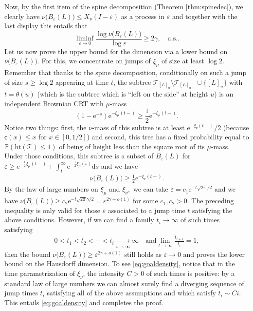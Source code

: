 \documentclass[11pt]{article}
\newcommand{\dH}{\gamma}
\newcommand{\cc}{\mathsf{c}}
\newcommand{\ff}{\cc}
\newcommand{\T}{\mathcal{T}}
\renewcommand{\geq}{\geqslant}
\renewcommand{\leq}{\leqslant}
\newcommand{\h}{\mathrm{ht}}
\begin{document}
Now, by the first item of the spine decomposition (Theorem \ref{thm:spinedec}), we clearly have $\nu\big(B_{ \varepsilon }(L)\big) \leq X_\nu(I - \varepsilon)$ as a process in $ \varepsilon$ and together with the last display this entails that 
$$ \liminf_{ \varepsilon \to 0} \frac{\log \nu \big( B_\varepsilon(L)\big) }{\log  \varepsilon} \geq  2 \dH, \quad \mbox{a.s.}.$$
Let us now prove the upper bound for the dimension via a lower bound on $\nu \big( B_\varepsilon(L)\big)$. For this, we concentrate on jumps of $\xi_\mu$ of size at least $\log 2$. Remember that thanks to the spine decomposition, conditionally on such a jump of size $s\geq \log 2$ appearing at time $t$, the subtree $\T_{[L]_{u}}\setminus \T_{[L]_{u+}} \cup \{[L]_{u}\}$ with $t=\theta(u)$ (which is the subtree which is ``left on the side'' at height $u$) is an independent Brownian CRT with $\mu$-mass $$(1- \mathrm{e}^{-s}) \mathrm{e}^{- \xi_\mu(t-)} \geq \frac{1}{2} \mathrm{e}^{- \xi_\mu(t-)}.$$ Notice two things: first, the $\nu$-mass of this subtree is at least $ \mathrm{e}^{- \xi_\nu(t-)}/2$ (because $\ff(x) \leq x$ for $x \in [0,1/2]$) and second, this tree has a fixed probability equal to $ \mathbb{P}( \h(\mathcal{T}) \leq 1)$ of being of height less than the square root of its $\mu$-mass. Under those conditions, this subtree is a subset of $B_{ \varepsilon}(L)$ for $\varepsilon \geq  \mathrm{e}^{-\frac12 \xi_\mu(t-)} + \int_{t}^\infty \mathrm{e}^{-\frac12 \xi_\mu(s)} \mathrm{d}s$ and we have
\begin{eqnarray} \label{eq:lowerbound12}\nu \big(B_{ \varepsilon}(L)\big) \geq \frac12 \mathrm{e}^{- \xi_\nu(t-)}. \end{eqnarray} By the law of large numbers on $\xi_\mu$ and $\xi_\nu,$ we can take $\varepsilon = c_1 \mathrm{e}^{- t \sqrt{2\pi}/2}$  and we have  $\nu \big(B_{ \varepsilon}(L)\big) \geq c_2 \mathrm{e}^{-  t \sqrt{2\pi} \gamma/2} = \varepsilon^{2\gamma + o(1)}$ for some $c_1,c_2>0$. The preceding inequality is only valid for those $ \varepsilon$ associated to a jump time $t$ satisfying the above conditions. However, if we can find a family $t_i \to \infty$ of such times satisfying 
\begin{eqnarray} \label{eq:goaldensity} 0 < t_1 < t_2 < \cdots < t_i \xrightarrow[i \to \infty]{} \infty \quad \mbox{and} \lim_{t \to \infty} \frac{t_{i+1}}{t_i} =1, \end{eqnarray} 
then the bound $\nu \big(B_{ \varepsilon}(L)\big) \geq  \varepsilon^{2\gamma + o(1)}$ still holds as $ \varepsilon \to 0$ and proves the lower bound on the Hausdorff dimension. To see \eqref{eq:goaldensity}, notice that in the time parametrization of $\xi_\nu$, the intensity $C>0$ of such times is positive: by a standard law of large numbers we can almost surely find a diverging sequence of jump times $t_i$ satisfying all of the above assumptions and which satisfy $t_i \sim C i$. This entails \eqref{eq:goaldensity} and completes the proof.\endproof
\end{document}
